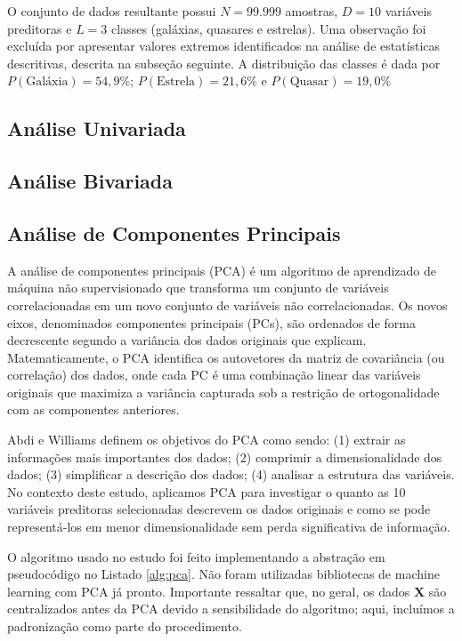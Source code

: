 \documentclass[conference]{IEEEtran}
\begin{document}
O conjunto de dados resultante possui $N=99.999$ amostras, $D=10$ variáveis preditoras e $L=3$ classes (galáxias, quasares e estrelas). Uma observação foi excluída por apresentar valores extremos identificados na análise de estatísticas descritivas, descrita na subseção seguinte. A distribuição das classes é dada por $P(\text{Galáxia})=54,9\%$; $P(\text{Estrela})=21,6\%$ e $P(\text{Quasar})=19,0\%$



\subsection{Análise Univariada}
\subsection{Análise Bivariada}


\subsection{Análise de Componentes Principais}

A análise de componentes principais (PCA) é um algoritmo de aprendizado de máquina não supervisionado que transforma um conjunto de variáveis correlacionadas em um novo conjunto de variáveis não correlacionadas. Os novos eixos, denominados componentes principais (PCs), são ordenados de forma decrescente segundo a variância dos dados originais que explicam. Matematicamente, o PCA identifica os autovetores da matriz de covariância (ou correlação) dos dados, onde cada PC é uma combinação linear das variáveis originais que maximiza a variância capturada sob a restrição de ortogonalidade com as componentes anteriores.

Abdi e Williams \cite{pca} definem os objetivos do PCA como sendo: (1) extrair as informações mais importantes dos dados; (2) comprimir a dimensionalidade dos dados; (3) simplificar a descrição dos dados; (4) analisar a estrutura das variáveis. No contexto deste estudo, aplicamos PCA para investigar o quanto as 10 variáveis preditoras selecionadas descrevem os dados originais e como se pode representá-los em menor dimensionalidade sem perda significativa de informação.

O algoritmo usado no estudo foi feito implementando a abstração em pseudocódigo no Listado \ref{alg:pca}. Não foram utilizadas bibliotecas de machine learning com PCA já pronto. Importante ressaltar que, no geral, os dados $\mathbf{X}$ são centralizados antes da PCA \cite{pca} devido a sensibilidade do algoritmo; aqui, incluímos a padronização como parte do procedimento.
\end{document}
